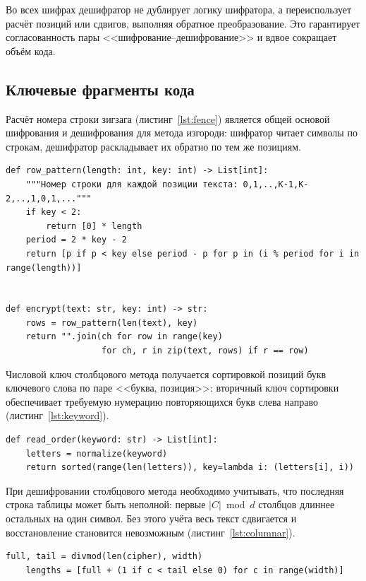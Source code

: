 \documentclass[14pt,a4paper]{extarticle}
\begin{document}
Во всех шифрах дешифратор не дублирует логику шифратора, а переиспользует расчёт
позиций или сдвигов, выполняя обратное преобразование. Это гарантирует согласованность
пары <<шифрование--дешифрование>> и вдвое сокращает объём кода.

\subsection{Ключевые фрагменты кода}

Расчёт номера строки зигзага (листинг~\ref{lst:fence}) является общей основой
шифрования и дешифрования для метода изгороди: шифратор читает символы по строкам,
дешифратор раскладывает их обратно по тем же позициям.

\begin{lstlisting}[style=python, caption={Метод <<железнодорожная изгородь>>}, label={lst:fence}]
def row_pattern(length: int, key: int) -> List[int]:
    """Номер строки для каждой позиции текста: 0,1,..,K-1,K-2,..,1,0,1,..."""
    if key < 2:
        return [0] * length
    period = 2 * key - 2
    return [p if p < key else period - p for p in (i % period for i in range(length))]


def encrypt(text: str, key: int) -> str:
    rows = row_pattern(len(text), key)
    return "".join(ch for row in range(key)
                   for ch, r in zip(text, rows) if r == row)
\end{lstlisting}

Числовой ключ столбцового метода получается сортировкой позиций букв ключевого слова
по паре <<буква, позиция>>: вторичный ключ сортировки обеспечивает требуемую нумерацию
повторяющихся букв слева направо (листинг~\ref{lst:keyword}).

\begin{lstlisting}[style=python, caption={Порядок чтения столбцов из ключевого слова}, label={lst:keyword}]
def read_order(keyword: str) -> List[int]:
    letters = normalize(keyword)
    return sorted(range(len(letters)), key=lambda i: (letters[i], i))
\end{lstlisting}

При дешифровании столбцового метода необходимо учитывать, что последняя строка таблицы
может быть неполной: первые $|C| \bmod d$ столбцов длиннее остальных на один символ.
Без этого учёта весь текст сдвигается и восстановление становится невозможным
(листинг~\ref{lst:columnar}).

\begin{lstlisting}[style=python, caption={Восстановление длин столбцов при дешифровании}, label={lst:columnar}]
    full, tail = divmod(len(cipher), width)
    lengths = [full + (1 if c < tail else 0) for c in range(width)]
\end{lstlisting}
\end{document}
